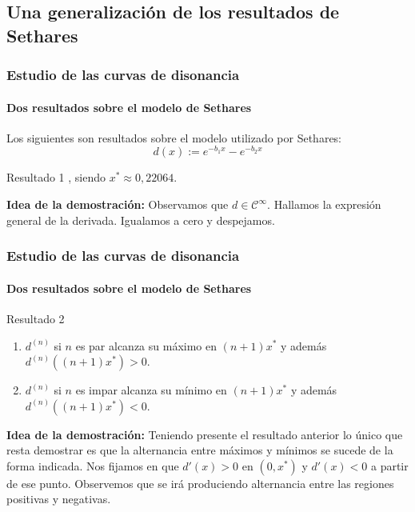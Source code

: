 \documentclass[12 pt]{beamer}
\begin{document}
\subsection{Una generalización de los resultados de Sethares}

\begin{frame}
    \frametitle{Estudio de las curvas de disonancia}
    \framesubtitle{Dos resultados sobre el modelo de Sethares}
    
    Los siguientes son resultados sobre el modelo utilizado por Sethares:
    \begin{equation*}
        \boxed{
            d(x) := e^{-b_1 x} - e^{-b_2 x}
        }
    \end{equation*}
    \begin{alertblock}{Resultado 1}
    , siendo $x^{*} \approx 0,22064$.
    \end{alertblock}
    
    \textbf{Idea de la demostración:} Observamos que $d \in \mathcal{C}^{\infty}$. Hallamos la expresión general de la derivada. Igualamos a cero y despejamos.
    
\end{frame}

\begin{frame}
    \frametitle{Estudio de las curvas de disonancia}
    \framesubtitle{Dos resultados sobre el modelo de Sethares}
    
    \begin{alertblock}{Resultado 2}
        \begin{enumerate}
            \item $d^{(n)}$ si $n$ es par alcanza su máximo en $(n+1)x^{*}$ y además $d^{(n)}((n+1)x^{*}) > 0$.
            \item $d^{(n)}$ si $n$ es impar alcanza su mínimo en $(n+1)x^{*}$ y además $d^{(n)}((n+1)x^{*}) < 0$.
        \end{enumerate}
    \end{alertblock}
    
    \textbf{Idea de la demostración:} Teniendo presente el resultado anterior lo único que resta demostrar es que la alternancia entre máximos y mínimos se sucede de la forma indicada.
    Nos fijamos en que $d'(x) > 0$ en $(0,x^{*})$ y $d'(x)<0$ a partir de ese punto. Observemos que se irá produciendo alternancia entre las regiones positivas y negativas.
    
\end{frame}
\end{document}
